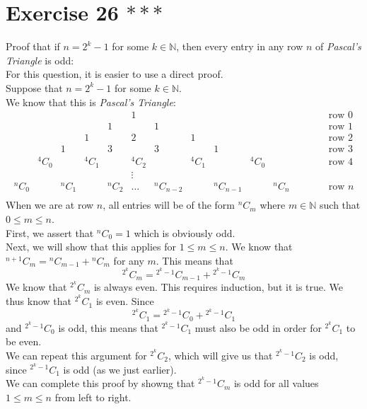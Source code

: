 \documentclass[12pt]{article}
\newcommand{\N}{\mathbb{N}}
\newcommand*{\comb}[2]{{}^{#1}C_{#2}}
\begin{document}
    \section*{Exercise 26 $***$}
    Proof that if $n = 2^k - 1$ for some $k \in \N$,
    then every entry in any row $n$
    of \textit{Pascal's Triangle} is odd: \\
    For this question, it is easier to use a direct proof. \\
    Suppose that $n = 2^k - 1$ for some $k \in \N$. \\
    We know that this is \textit{Pascal's Triangle}:
    \[
    \begin{array}{ccccccccccccc}
    &   &   &   &   & 1 &   &   &   &   &   &   &  \qquad \text{ row } 0 \\
    &   &   &   & 1 &   & 1 &   &   &   &   &   & \qquad \text{ row } 1  \\
    &   &   & 1 &   & 2 &   & 1 &   &   &   &   & \qquad \text{ row } 2  \\
    &   & 1 &   & 3 &   & 3 &   & 1 &   &   &   & \qquad \text{ row } 3 \\
    & \comb{4}{0} &   & \comb{4}{1} &   & \comb{4}{2} &   & 
    \comb{4}{1} &   & \comb{4}{0} &   &   & \qquad \text{ row } 4 \\
    &   &  &   &  & \vdots &  &  &  &   &  &   &   \\
    \comb{n}{0} &   & \comb{n}{1} &   & \comb{n}{2} & \dots &
    \comb{n}{n-2} &  & \comb{n}{n-1} &   & \comb{n}{n} &   & 
    \qquad \text{ row } n \\
    \end{array}
    \]
    When we are at row $n$,
    all entries will be of the form $\comb{n}{m}$
    where $m \in \N$ such that $0 \leqslant m \leqslant n$. \\
    First, we assert that $\comb{n}{0} = 1$
    which is obviously odd. \\
    Next, we will show that this applies
    for $1 \leqslant m \leqslant n$.
    We know that $\comb{n+1}{m} = \comb{n}{m-1} + \comb{n}{m}$
    for any $m$.
    This means that
    \[ \comb{2^k}{m} = \comb{2^k-1}{m-1} + \comb{2^k-1}{m} \]
    We know that $\comb{2^k}{m}$ is always even.
    This requires induction,
    but it is true.
    We thus know that $\comb{2^k}{1}$ is even.
    Since 
    \[ \comb{2^k}{1} = \comb{2^k-1}{0} + \comb{2^k-1}{1} \]
    and $\comb{2^k-1}{0}$ is odd,
    this means that $\comb{2^k-1}{1}$ must also be odd
    in order for $\comb{2^k}{1}$ to be even. \\
    We can repeat this argument for $\comb{2^k}{2}$,
    which will give us that $\comb{2^k-1}{2}$ is odd,
    since $\comb{2^k-1}{1}$ is odd (as we just earlier). \\
    We can complete this proof by showng that $\comb{2^k-1}{m}$
    is odd for all values $1 \leqslant m \leqslant n$
    from left to right. \\
\end{document}
